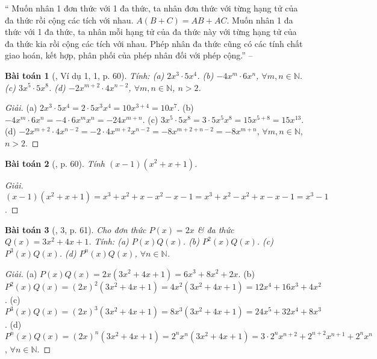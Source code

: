 \documentclass{article}
\newtheorem{baitoan}{Bài toán}
\begin{document}
`` Muốn nhân 1 đơn thức với 1 đa thức, ta nhân đơn thức với từng hạng tử của đa thức rồi cộng các tích với nhau. $A(B + C) = AB + AC$.  Muốn nhân 1 đa thức với 1 đa thức, ta nhân mỗi hạng tử của đa thức này với từng hạng tử của đa thức kia rồi cộng các tích với nhau.  Phép nhân đa thức cũng có các tính chất giao hoán, kết hợp, phân phối của phép nhân đối với phép cộng.'' -- \cite[Chap. III, \S4, p. 43]{Tuyen_Toan_7}

\begin{baitoan}[\cite{SGK_Toan_7_Canh_Dieu_tap_2}, Ví dụ 1, 1, p. 60]
	Tính: (a) $2x^3\cdot5x^4$. (b) $-4x^m\cdot6x^n$, $\forall m,n\in\mathbb{N}$. (c) $3x^5\cdot5x^8$. (d) $-2x^{m+2}\cdot4x^{n-2}$, $\forall m,n\in\mathbb{N}$, $n > 2$.
\end{baitoan}

\begin{proof}[Giải]
	(a) $2x^3\cdot5x^4 = 2\cdot5x^3x^4 = 10x^{3+4} = 10x^7$. (b) $-4x^m\cdot6x^n = -4\cdot6x^mx^n = -24x^{m+n}$. (c) $3x^5\cdot5x^8 = 3\cdot5x^5x^8 = 15x^{5+8} = 15x^{13}$. (d) $-2x^{m+2}\cdot4x^{n-2} = -2\cdot4x^{m+2}x^{n-2} = -8x^{m+2+n-2} = -8x^{m+n}$, $\forall m,n\in\mathbb{N}$, $n > 2$.
\end{proof}

\begin{baitoan}[\cite{SGK_Toan_7_Canh_Dieu_tap_2}, p. 60]
	Tính $(x - 1)(x^2 + x + 1)$.
\end{baitoan}

\begin{proof}[Giải]
	$(x - 1)(x^2 + x + 1) = x^3 + x^2 + x - x^2 - x - 1 = x^3 + x^2 - x^2 + x - x - 1 = x^3 - 1$.
\end{proof}

\begin{baitoan}[\cite{SGK_Toan_7_Canh_Dieu_tap_2}, 3, p. 61]
	Cho đơn thức $P(x) = 2x$ \& đa thức $Q(x) = 3x^2 + 4x + 1$. Tính: (a) $P(x)Q(x)$. (b) $P^2(x)Q(x)$. (c) $P^3(x)Q(x)$. (d) $P^n(x)Q(x)$, $\forall n\in\mathbb{N}$.
\end{baitoan}

\begin{proof}[Giải]
	(a) $P(x)Q(x) = 2x(3x^2 + 4x + 1) = 6x^3 + 8x^2 + 2x$. (b) $P^2(x)Q(x) = (2x)^2(3x^2 + 4x + 1) = 4x^2(3x^2 + 4x + 1) = 12x^4 + 16x^3 + 4x^2$. (c) $P^3(x)Q(x) = (2x)^3(3x^2 + 4x + 1) = 8x^3(3x^2 + 4x + 1) = 24x^5 + 32x^4 + 8x^3$. (d)  $P^n(x)Q(x) = (2x)^n(3x^2 + 4x + 1) = 2^nx^n(3x^2 + 4x + 1) = 3\cdot2^nx^{n+2} + 2^{n+2}x^{n+1} + 2^nx^n$, $\forall n\in\mathbb{N}$.
\end{proof}
\end{document}
